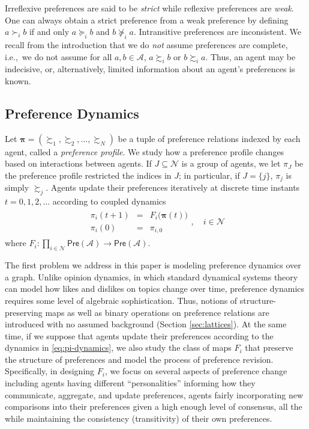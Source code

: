 \documentclass[conference]{ieeeconf}
\renewcommand{\succeq}{\succcurlyeq}
\newcommand{\N}{\mathcal{N}}
\newcommand{\A}{\mathcal{A}}
\newcommand{\Pref}{\mathsf{Pre}}
\newcommand{\prefers}{\succsim}
\newcommand{\profile}{\boldsymbol{\pi}}
\begin{document}
Irreflexive preferences are said to be \emph{strict} while reflexive preferences are \emph{weak}. One can always obtain a strict preference from a weak preference by defining $a \succ_i b$ if and only $a \succeq_i b$ and $b \not\succeq_i a$. Intransitive preferences are inconsistent. We recall from the introduction that we do \emph{not} assume preferences are complete, i.e.,~we do not assume for all $a,b \in \A$, $a \prefers_i b$ or $b \prefers_i a$. Thus, an agent may be indecisive, or, alternatively, limited information about an agent's preferences is known.

\subsection{Preference Dynamics}

Let $\profile = \left( \prefers_1, \prefers_2, \dots, \prefers_N \right)$ be a tuple of preference relations indexed by each agent, called a \emph{preference profile}. We study how a preference profile changes based on interactions between agents. If $J \subseteq \N$ is a group of agents, we let $\pi_{J}$ be the preference profile restricted the indices in $J$; in particular, if $J = \{j\}$, $\pi_j$ is simply $\prefers_j$.
Agents update their preferences iteratively at discrete time instants $t=0,1,2,\dots$ according to coupled dynamics
\begin{align}
    \begin{aligned}
        \pi_i(t+1) &=& F_i \bigl( \profile(t) \bigr)  \\
        \pi_i(0) &=& \pi_{i,0}
    \end{aligned}, \quad i \in \N
    \label{eq:pi-dynamics}
\end{align}
where $F_i: \prod_{i \in \N}  \Pref(\A) \to \Pref(\A)$.

The first problem we address in this paper is modeling preference dynamics over a graph. Unlike opinion dynamics, in which standard dynamical systems theory can model how likes and dislikes on topics change over time, preference dynamics requires some level of algebraic sophistication. Thus, notions of structure-preserving maps as well as binary operations on preference relations are introduced with no assumed background (Section \ref{sec:lattices}). At the same time, if we suppose that agents update their preferences according to the dynamics in \eqref{eq:pi-dynamics}, we also study the class of maps $F_i$ that preserve the structure of preferences and model the process of preference revision. Specifically, in designing $F_i$, we focus on several aspects of preference change including agents having different ``personalities'' informing how they communicate, aggregate, and update preferences, agents fairly incorporating new comparisons into their preferences given a high enough level of consensus, all the while maintaining the consistency (transitivity) of their own preferences.
\end{document}
